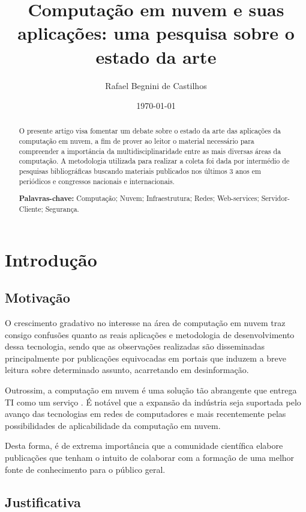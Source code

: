 \documentclass[12pt]{article}
\author{Rafael Begnini de Castilhos}
\title{Computação em nuvem e suas aplicações: uma pesquisa sobre o estado da arte}
\date{\today}
\begin{document}
\maketitle

\begin{abstract}
O presente artigo visa fomentar um debate sobre o estado da arte das aplicações da computação em nuvem, a fim de prover ao leitor o material necessário para compreender a importância da multidisciplinaridade entre as mais diversas áreas da computação. A metodologia utilizada para realizar a coleta foi dada por intermédio de pesquisas bibliográficas buscando materiais publicados nos últimos 3 anos em periódicos e congressos nacionais e internacionais.

\textbf{Palavras-chave:} Computação; Nuvem; Infraestrutura; Redes; Web-services; Servidor-Cliente; Segurança.

\end{abstract}

\section{Introdução}

\subsection{Motivação}

O crescimento gradativo no interesse na área de computação em nuvem traz consigo confusões quanto as reais aplicações e metodologia de desenvolvimento dessa tecnologia, sendo que as observações realizadas são disseminadas principalmente por publicações equivocadas em portais que induzem a breve leitura sobre determinado assunto, acarretando em desinformação. 

Outrossim, a computação em nuvem é uma solução tão abrangente que entrega TI como um serviço \cite{oliveira}. É notável que a expansão da indústria seja suportada pelo avanço das tecnologias em redes de computadores e mais recentemente pelas possibilidades de aplicabilidade da computação em nuvem.

Desta forma, é de extrema importância que a comunidade científica elabore publicações que tenham o intuito de colaborar com a formação de uma melhor fonte de conhecimento para o público geral.

\subsection{Justificativa}
\end{document}
